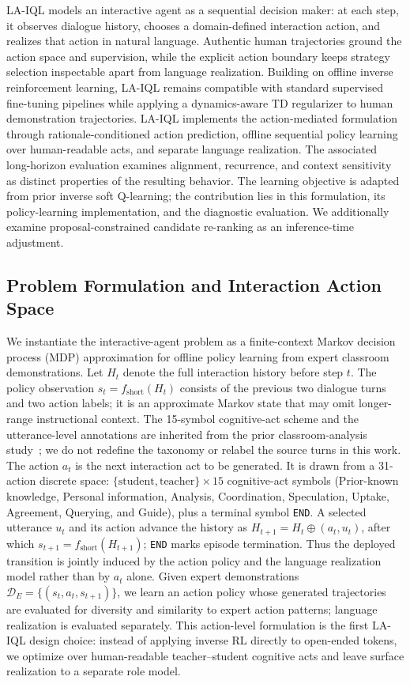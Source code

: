 \documentclass[manuscript,review,anonymous]{acmart}
\begin{document}
LA-IQL models an interactive agent as a sequential decision maker: at each
step, it observes dialogue history, chooses a domain-defined interaction
action, and realizes that action in natural language. Authentic human
trajectories ground the action space and supervision, while the explicit action
boundary keeps strategy selection inspectable apart from language realization.
Building on offline inverse reinforcement learning, LA-IQL remains compatible
with standard supervised fine-tuning pipelines while applying a dynamics-aware
TD regularizer to human demonstration trajectories. LA-IQL implements the
action-mediated formulation through rationale-conditioned action prediction,
offline sequential policy learning over human-readable acts, and separate
language realization. The associated long-horizon evaluation examines
alignment, recurrence, and context sensitivity as distinct properties of the
resulting behavior. The learning objective is adapted from prior inverse soft
Q-learning; the contribution lies in this formulation, its policy-learning
implementation, and the diagnostic evaluation. We additionally examine
proposal-constrained candidate re-ranking as an inference-time adjustment.

\subsection{Problem Formulation and Interaction Action Space}
\label{sec:problem}

We instantiate the interactive-agent problem as a finite-context Markov
decision process (MDP) approximation for offline policy learning from expert
classroom demonstrations. Let $H_t$ denote the full interaction history before
step $t$.
The policy observation $s_t=f_{\mathrm{short}}(H_t)$ consists of the previous two dialogue turns and two action labels; it is an approximate Markov state that may omit longer-range instructional context.
The 15-symbol cognitive-act scheme and the utterance-level annotations are
inherited from the prior classroom-analysis study~\citep{songyu79}; we do not
redefine the taxonomy or relabel the source turns in this work.
The action $a_t$ is the next interaction act to be generated.
It is drawn from a 31-action discrete space:
$\{\text{student}, \text{teacher}\} \times 15$ cognitive-act symbols
(Prior-known knowledge, Personal information, Analysis, Coordination,
Speculation, Uptake, Agreement, Querying, and Guide),
plus a terminal symbol \texttt{END}.
A selected utterance $u_t$ and its action advance the history as $H_{t+1}=H_t\oplus(a_t,u_t)$, after which $s_{t+1}=f_{\mathrm{short}}(H_{t+1})$; \texttt{END} marks episode termination. Thus the deployed transition is jointly induced by the action policy and the language realization model rather than by $a_t$ alone.
Given expert demonstrations $\mathcal{D}_E=\{(s_t,a_t,s_{t+1})\}$, we learn an action policy whose generated trajectories are evaluated for diversity and similarity to expert action patterns; language realization is evaluated separately.
This action-level formulation is the first LA-IQL design choice: instead of applying inverse RL directly to open-ended tokens, we optimize over human-readable teacher--student cognitive acts and leave surface realization to a separate role model.
\end{document}
